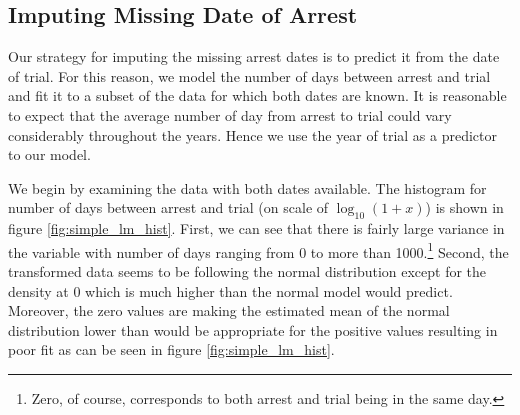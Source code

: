 




\subsection{Imputing Missing Date of Arrest} \label{subsec:imputing_missing_date}
Our strategy for imputing the missing arrest dates is to  predict it from the date of trial. For this reason, we model the number of days between arrest and trial and fit it to a subset of the data for which both dates are known. It  is reasonable to expect that the average number of day from  arrest to trial could  vary considerably throughout the years.    %
Hence we use the year of trial as a predictor to our model. 

We begin by examining the data with both dates available. 
The histogram for number of days between arrest and trial (on scale of $\log_{10}(1 + x)$) is shown in figure \ref{fig:simple_lm_hist}. First, we can see that there is fairly large variance in the variable with   number of days ranging from 0 to more than 1000.\footnote{Zero, of course, corresponds to both arrest and trial being in the same day.}  Second, the transformed data seems to be following the normal distribution except for the density at 0
 which is much higher than the normal model would predict. Moreover, the  zero values are making the estimated mean of the normal distribution lower than would be appropriate for the positive values resulting in poor fit as can be seen in figure  \ref{fig:simple_lm_hist}. 

